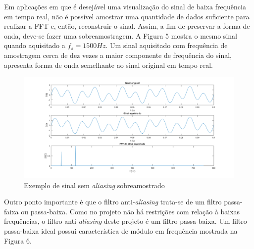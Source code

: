 \documentclass[11pt]{abntex2}
\begin{document}
				Em aplicações em que é desejável uma visualização do sinal de
				baixa frequência em tempo real, não é possível amostrar uma
				quantidade de dados suficiente para realizar a FFT e, então,
				reconstruir o sinal. Assim, a fim de preservar a forma de onda,
				deve-se fazer uma sobreamostragem. A Figura 5 mostra o mesmo
				sinal quando aquisitado a $f_s = 1500Hz$. Um sinal aquisitado
				com frequência de amostragem cerca de dez vezes a maior
				componente de frequência do sinal, apresenta forma de onda
				semelhante ao sinal original em tempo real.

				\begin{figure}[!ht]
					\centering
					\includegraphics[width=\linewidth]{../Fotos/aliasingFs1500.png}
					\caption{Exemplo de sinal sem \textit{aliasing} sobreamostrado}
				\end{figure}

				Outro ponto importante é que o filtro anti-\textit{aliasing} trata-se de um
				filtro passa-faixa ou passa-baixa. Como no projeto não há restrições
				com relação à baixas frequências, o filtro anti-\textit{aliasing} deste
				projeto é um filtro passa-baixa. Um filtro passa-baixa ideal possui
				característica de módulo em frequência mostrada na Figura 6.
\end{document}
